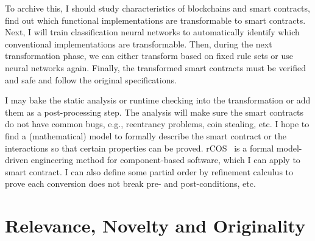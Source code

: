 To archive this, I should study characteristics of blockchains and smart contracts, find out which functional implementations are transformable to smart contracts.
Next, I will train classification neural networks to automatically identify which conventional implementations are transformable.
Then, during the next transformation phase, we can either transform based on fixed rule sets or use neural networks again.
Finally, the transformed smart contracts must be verified and safe and follow the original specifications.

I may bake the static analysis or runtime checking into the transformation or add them as a post-processing step.
The analysis will make sure the smart contracts do not have common bugs, e.g., reentrancy problems, coin stealing, etc.
I hope to find a (mathematical) model to formally describe the smart contract or the interactions so that certain properties can be proved.
rCOS~\cite{ke2012rcos} is a formal model-driven engineering method for component-based software, which I can apply to smart contract.
I can also define some partial order by refinement calculus to prove each conversion does not break pre- and post-conditions, etc.











\section{Relevance, Novelty and Originality}

